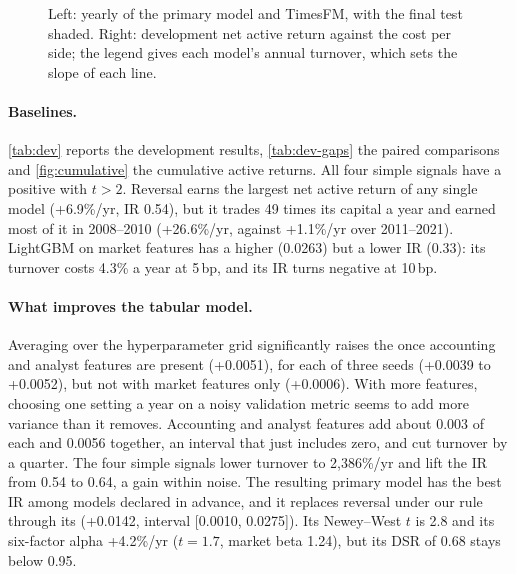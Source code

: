 \begin{figure}[t]
\centering

\caption{Left: yearly \ric{} of the primary model and TimesFM, with the final test shaded. Right: development net active return against the cost per side; the legend gives each model's annual turnover, which sets the slope of each line.}
\label{fig:ic-cost}
\end{figure}

\paragraph{Baselines.}
\cref{tab:dev} reports the development results, \cref{tab:dev-gaps} the paired comparisons and \cref{fig:cumulative} the cumulative active returns.
All four simple signals have a positive \ric{} with $t>2$.
Reversal earns the largest net active return of any single model (+6.9\%/yr, IR 0.54), but it trades 49 times its capital a year and earned most of it in 2008--2010 (+26.6\%/yr, against +1.1\%/yr over 2011--2021).
LightGBM on market features has a higher \ric{} (0.0263) but a lower IR (0.33): its turnover costs 4.3\% a year at 5\,bp, and its IR turns negative at 10\,bp.

\paragraph{What improves the tabular model.}
Averaging over the hyperparameter grid significantly raises the \ric{} once accounting and analyst features are present (+0.0051), for each of three seeds (+0.0039 to +0.0052), but not with market features only (+0.0006).
With more features, choosing one setting a year on a noisy validation metric seems to add more variance than it removes.
Accounting and analyst features add about 0.003 of \ric{} each and 0.0056 together, an interval that just includes zero, and cut turnover by a quarter.
The four simple signals lower turnover to 2,386\%/yr and lift the IR from 0.54 to 0.64, a gain within noise.
The resulting primary model has the best IR among models declared in advance, and it replaces reversal under our rule through its \ric{} (+0.0142, interval [0.0010, 0.0275]).
Its Newey--West $t$ is 2.8 and its six-factor alpha +4.2\%/yr ($t=1.7$, market beta 1.24), but its DSR of 0.68 stays below 0.95.

